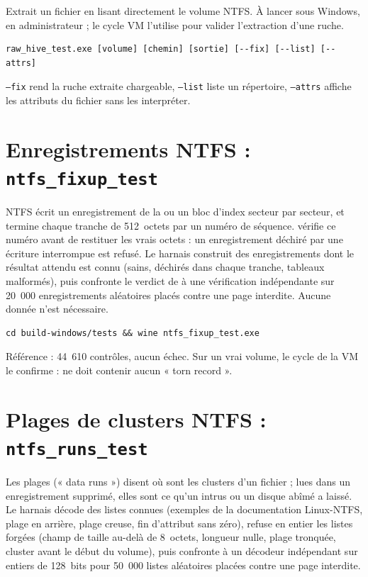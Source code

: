 \documentclass[11pt,a4paper,oneside]{report}
\begin{document}
Extrait un fichier en lisant directement le volume NTFS. À lancer sous Windows,
en administrateur ; le cycle VM l'utilise pour valider l'extraction d'une ruche.

\begin{lstlisting}
raw_hive_test.exe [volume] [chemin] [sortie] [--fix] [--list] [--attrs]
\end{lstlisting}

\texttt{--fix} rend la ruche extraite chargeable, \texttt{--list} liste un
répertoire, \texttt{--attrs} affiche les attributs  du fichier
sans les interpréter.

\section{Enregistrements NTFS : \texttt{ntfs\_fixup\_test}}

NTFS écrit un enregistrement de la  ou un bloc d'index
secteur par secteur, et termine chaque tranche de 512~octets par un numéro de
séquence. \wac{} vérifie ce numéro avant de restituer les vrais octets : un
enregistrement déchiré par une écriture interrompue est refusé. Le harnais
construit des enregistrements dont le résultat attendu est connu (sains,
déchirés dans chaque tranche, tableaux malformés), puis confronte le verdict de
\wac{} à une vérification indépendante sur 20~000 enregistrements aléatoires
placés contre une page interdite. Aucune donnée n'est nécessaire.

\begin{lstlisting}
cd build-windows/tests && wine ntfs_fixup_test.exe
\end{lstlisting}

Référence : 44~610 contrôles, aucun échec. Sur un vrai volume, le cycle de la
VM le confirme :  ne doit contenir aucun « torn record ».

\section{Plages de clusters NTFS : \texttt{ntfs\_runs\_test}}

Les plages (« data runs ») disent où sont les clusters d'un fichier ; lues
dans un enregistrement supprimé, elles sont ce qu'un intrus ou un disque abîmé
a laissé. Le harnais décode des listes connues (exemples de la documentation
Linux-NTFS, plage en arrière, plage creuse, fin d'attribut sans zéro), refuse
en entier les listes forgées (champ de taille au-delà de 8~octets, longueur
nulle, plage tronquée, cluster avant le début du volume), puis confronte
\wac{} à un décodeur indépendant sur entiers de 128~bits pour 50~000 listes
aléatoires placées contre une page interdite.
\end{document}
